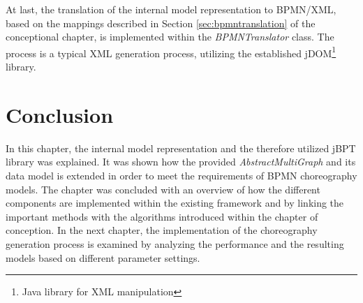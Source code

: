 At last, the translation of the internal model representation to BPMN/XML, based on the mappings described in Section \ref{sec:bpmntranslation} of the conceptional chapter, is implemented within the \textit{BPMNTranslator} class. The process is a typical XML generation process, utilizing the established jDOM\footnote{Java library for XML manipulation} library.

\section{Conclusion}
In this chapter, the internal model representation and the therefore utilized jBPT library was explained. It was shown how the provided \textit{AbstractMultiGraph} and its data model is extended in order to meet the requirements of BPMN choreography models. The chapter was concluded with an overview of how the different components are implemented within the existing framework and by linking the important methods with the algorithms introduced within the chapter of conception. In the next chapter, the implementation of the choreography generation process is examined by analyzing the performance and the resulting models based on different parameter settings. 
